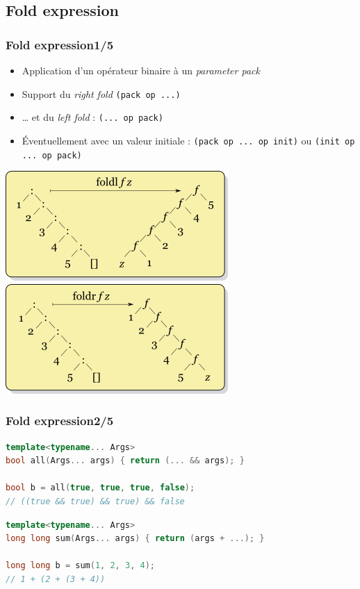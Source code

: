 \documentclass[C++.tex]{subfiles}
\begin{document}
\subsection*{Fold expression}
\begin{frame}[fragile]
	\frametitle{Fold expression\titlehfill{}1/5}
	\begin{itemize}
		\item Application d'un opérateur binaire à un \textit{parameter pack}
		\item Support du \textit{right fold} \lstinline|(pack op ...)|
		\item \ldots{} et du \textit{left fold} : \lstinline|(... op pack)|
		\item Éventuellement avec un valeur initiale : \lstinline|(pack op ... op init)| ou \lstinline|(init op ... op pack)|
	\end{itemize}

	\begin{center}
		\includegraphics[height=0.30\textheight]{input_src/Left-fold-transformation.png} \includegraphics[height=0.30\textheight]{input_src/Right-fold-transformation.png}
	\end{center}
\end{frame}

\begin{frame}[fragile]
	\frametitle{Fold expression\titlehfill{}2/5}
	\begin{lstlisting}[language=C++]
template<typename... Args>
bool all(Args... args) { return (... && args); }

bool b = all(true, true, true, false);
// ((true && true) && true) && false\end{lstlisting}

	\begin{lstlisting}[language=C++]
template<typename... Args>
long long sum(Args... args) { return (args + ...); }

long long b = sum(1, 2, 3, 4);
// 1 + (2 + (3 + 4))\end{lstlisting}
\end{frame}
\end{document}
